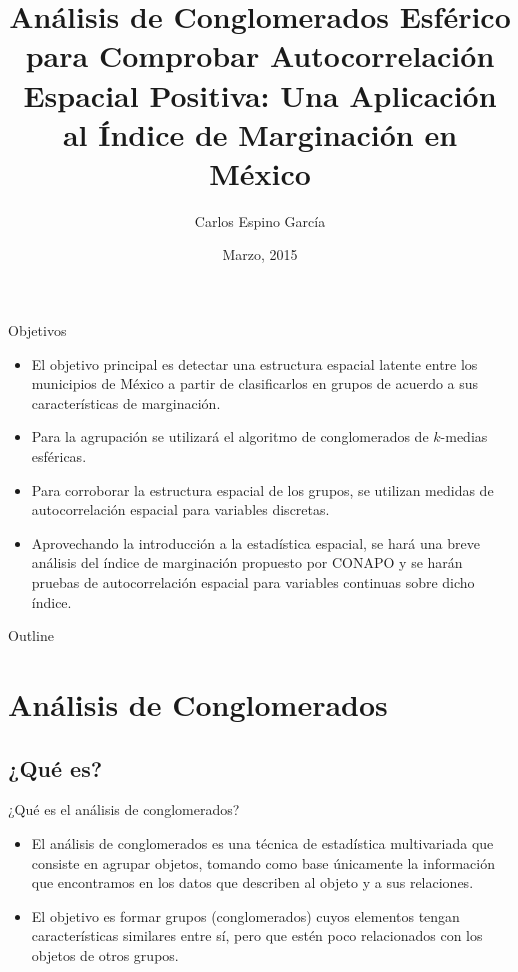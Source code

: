 \documentclass{beamer}
\title{Análisis de Conglomerados Esférico para Comprobar Autocorrelación Espacial Positiva: Una Aplicación al Índice de Marginación en México}
\author{Carlos Espino García}
\institute[ITAM] %
{
  Instituto Tecnológico Autónomo de México\\
}
\date{Marzo, 2015}
\begin{document}
\begin{frame}
  \titlepage
\end{frame}
\begin{frame}{Objetivos}
\begin{itemize}
  \item El objetivo principal es detectar una estructura espacial latente entre los municipios de México a partir de clasificarlos en grupos de acuerdo a sus características de marginación.
  \item Para la agrupación se utilizará el algoritmo de conglomerados de $k$-medias esféricas.
  \item Para corroborar la estructura espacial de los grupos, se utilizan medidas de autocorrelación espacial para variables discretas.
  \item Aprovechando la introducción a la estadística espacial, se hará una breve análisis del índice de marginación propuesto por CONAPO y se harán pruebas de autocorrelación espacial para variables continuas sobre dicho índice. 
\end{itemize}
\end{frame}
\begin{frame}{Outline}
  \tableofcontents
\end{frame}

\section{Análisis de Conglomerados}

\subsection{¿Qué es?}

\begin{frame}{¿Qué es el análisis de conglomerados?}{}
  \begin{itemize}
  \item {
    El análisis de conglomerados es una técnica de estadística multivariada que consiste en agrupar objetos, tomando como base únicamente la información que encontramos en los datos que describen al objeto y a sus relaciones.
  }
  \item {
    El objetivo es formar grupos (conglomerados) cuyos elementos tengan características similares entre sí, pero que estén poco relacionados con los objetos de otros grupos.  
  }
  \end{itemize}
\end{frame}
\end{document}
